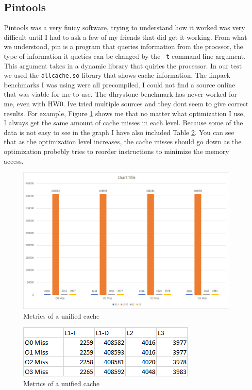 \documentclass{article}
\begin{document}
	\subsection{Pintools}
		Pintools was a very finicy software, trying to understand how it worked was very difficult until I had to ask a few of my friends that did get it working. From what we understood, pin is a program that queries information from the procssor, the type of information it queties can be changed by the \verb|-t| command line argument. This argument takes in a dynamic library that quiries the processor. In our test we used the \verb|allcache.so| library that shows cache information. The linpack benchmarks I was using were all precompiled, I could not find a source online that was viable for me to use. The dhrystone benchmark has never worked for me, even with HW0. Ive tried multiple sources and they dont seem to give correct results. For example, Figure \ref{fig:dry_graph} shows me that no matter what optimization I use, I always get the same amount of cache misses in each level. Because some of the data is not easy to see in the graph I have also included Table \ref{fig:dry_table}. You can see that as the optimization level increases, the cache misses should go down as the optimization probebly tries to reorder instructions to minimize the memory access.
		\begin{figure}[H]
			\label{fig:dry_graph}
			\begin{center}
				\includegraphics[width=\textwidth]{dry_graph.png}
				\caption{Metrics of a unified cache}
			\end{center}
		\end{figure}
		\begin{figure}[H]
			\label{fig:dry_table}
			\begin{center}
				\includegraphics[width=\textwidth]{dry_table.png}
				\caption{Metrics of a unified cache}
			\end{center}
		\end{figure}
\end{document}
